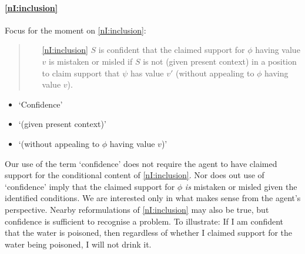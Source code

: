 \paragraph{\ref{nI:inclusion}}

\begin{note}[\ref{nI:inclusion}]
  Focus for the moment on \ref{nI:inclusion}:
  \begin{quote}
    \begin{enumerate}[ref=(\textsf{NI}:\arabic*)]
    \item[\ref{nI:inclusion}] \(S\) is confident that the claimed support for \(\phi\) having value \(v\) is mistaken or misled if \(S\) is not (given present context) in a position to claim support that \(\psi\) has value \(v'\) (without appealing to \(\phi\) having value \(v\)).
    \end{enumerate}
  \end{quote}
\end{note}

\begin{note}
  \begin{itemize}
  \item `Confidence'
  \item `(given present context)'
  \item `(without appealing to \(\phi\) having value \(v\))'
  \end{itemize}
\end{note}

\begin{note}[`Confidence']
  Our use of the term `confidence' does not require the agent to have claimed support for the conditional content of \ref{nI:inclusion}.
  Nor does out use of `confidence' imply that the claimed support for \(\phi\) \emph{is} mistaken or misled given the identified conditions.
  We are interested only in what makes sense from the agent's perspective.
  Nearby reformulations of \ref{nI:inclusion} may also be true, but confidence is sufficient to recognise a problem.
  To illustrate: If I am confident that the water is poisoned, then regardless of whether I claimed support for the water being poisoned, I will not drink it.
\end{note}

